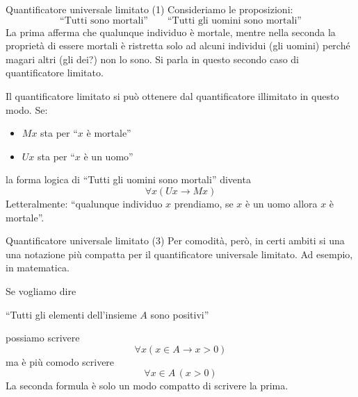 \documentclass[10pt,dvipsnames,xcolor=table,handout]{beamer}
\begin{document}
\begin{frame}{Quantificatore universale limitato (1)}
    Consideriamo le proposizioni:
    \[
        \text{``Tutti sono mortali''} \qquad \text{``Tutti gli uomini sono mortali''}
    \]
    La prima afferma che qualunque individuo è mortale,  mentre nella seconda la proprietà di essere mortali è ristretta solo ad alcuni individui (gli uomini) perché magari altri (gli dei?) non lo sono. Si parla in questo secondo caso di \alert{quantificatore limitato}.

    \medskip
    Il quantificatore limitato si può ottenere dal quantificatore illimitato in questo modo. Se:
    \begin{itemize}
        \item $Mx$ sta per ``$x$ è mortale''
        \item $Ux$ sta per ``$x$ è un uomo''
    \end{itemize}
    la forma logica di ``Tutti gli uomini sono mortali'' diventa
    \[
        \forall x (Ux \to Mx)
    \]
    Letteralmente: ``qualunque individuo $x$ prendiamo, se $x$ è un uomo allora $x$ è mortale''.
\end{frame}

\begin{frame}{Quantificatore universale limitato (3)}
    Per comodità, però, in certi ambiti si una una notazione più compatta per il quantificatore universale limitato. Ad esempio, in matematica.
    \begin{example}
        Se vogliamo dire
        \begin{center}
            ``Tutti gli elementi dell'insieme $A$ sono positivi''
        \end{center}
        possiamo scrivere
        \[
            \forall x (x \in A \to x > 0)
        \]
        ma è più comodo scrivere
        \[
            \forall x \in A \, (x > 0)
        \]
        La seconda formula è solo un modo compatto di scrivere la prima.
    \end{example}
\end{frame}
\end{document}
